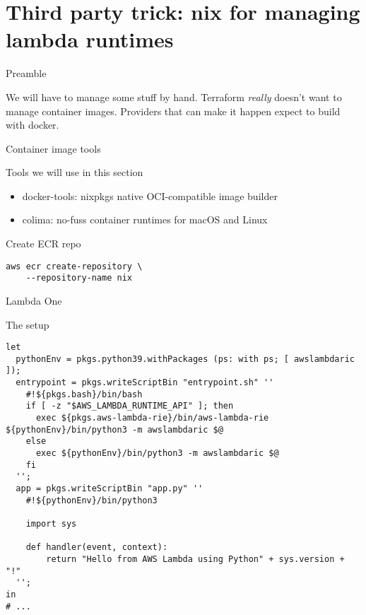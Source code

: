 \documentclass[bigger]{beamer}
\begin{document}
\section{Third party trick: nix for managing lambda runtimes}
\label{sec:orgcb633bc}
\begin{frame}[label={sec:org698c061}]{Preamble}
\begin{alertblock}{We will have to manage some stuff by hand.}
Terraform \emph{really} doesn't want to manage container images.
Providers that can make it happen expect to build with docker.
\end{alertblock}
\end{frame}
\begin{frame}[label={sec:org94e5318},fragile]{Container image tools}
 \begin{alertblock}{Tools we will use in this section}
\begin{itemize}
\item docker-tools: nixpkgs native OCI-compatible image builder
\item colima: no-fuss container runtimes for macOS and Linux
\end{itemize}
\end{alertblock}
\begin{exampleblock}{Create ECR repo}
\begin{verbatim}
aws ecr create-repository \
    --repository-name nix
\end{verbatim}
\end{exampleblock}
\end{frame}
\begin{frame}[label={sec:orgc4209ac},fragile]{Lambda One}
 \begin{block}{The setup}
\tiny
\begin{verbatim}
let
  pythonEnv = pkgs.python39.withPackages (ps: with ps; [ awslambdaric ]);
  entrypoint = pkgs.writeScriptBin "entrypoint.sh" ''
    #!${pkgs.bash}/bin/bash
    if [ -z "$AWS_LAMBDA_RUNTIME_API" ]; then
      exec ${pkgs.aws-lambda-rie}/bin/aws-lambda-rie ${pythonEnv}/bin/python3 -m awslambdaric $@
    else
      exec ${pythonEnv}/bin/python3 -m awslambdaric $@
    fi
  '';
  app = pkgs.writeScriptBin "app.py" ''
    #!${pythonEnv}/bin/python3

    import sys

    def handler(event, context):
        return "Hello from AWS Lambda using Python" + sys.version + "!"
  '';
in
# ...
\end{verbatim}
\end{block}
\end{frame}
\end{document}
